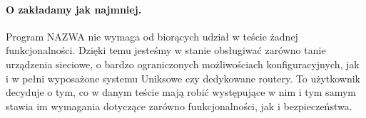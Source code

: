 \documentclass[00-praca-magisterska.tex]{subfiles}
\begin{document}

\paragraph{O  zakładamy jak najmniej.} Program NAZWA nie
wymaga od  biorących udział w teście żadnej funkcjonalności.
Dzięki temu jesteśmy w stanie obsługiwać zarówno tanie urządzenia sieciowe, o
bardzo ograniczonych możliwościach konfiguracyjnych, jak i w pełni wyposażone
systemu Uniksowe czy dedykowane routery. To użytkownik decyduje o tym, co w
danym teście mają robić występujące w nim  i tym samym stawia
im wymagania dotyczące zarówno funkcjonalności, jak i bezpieczeństwa.
\end{document}

